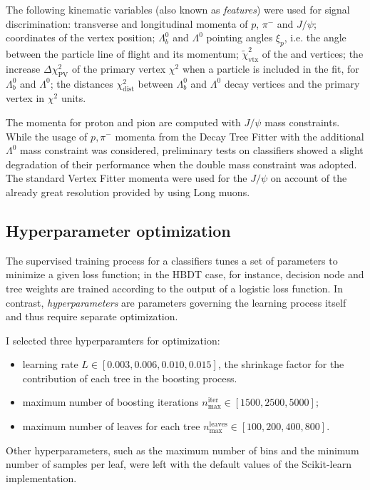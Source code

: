 The following kinematic variables (also known as \textit{features}) were used for signal discrimination:
transverse and longitudinal momenta of $p$, $\pi^-$ and $J/\psi$;
coordinates of the \lambdadecay vertex position;
$\Lambda_b^0$ and $\Lambda^0$  pointing angles $\xi_p$, i.e. the angle between the particle line of flight and its momentum;
$\tilde{\chi}^2_\text{vtx}$ of the \demonstratorshort and \lambdadecay vertices;
the increase $\Delta \chi^2_\text{PV}$ of the primary vertex $\chi^2$ when a particle is included in the fit, for $\Lambda_b^0$ and $\Lambda^0$;
the distances $\chi^2_\text{dist}$ between $\Lambda_b^0$ and $\Lambda^0$ decay vertices and the primary vertex in $\chi^2$ units.

The momenta for proton and pion are computed with $J/\psi$ mass constraints.
While the usage of $p,\pi^-$ momenta from the Decay Tree Fitter with the additional $\Lambda^0$ mass constraint was considered, preliminary tests on classifiers showed a slight degradation of their performance when the double mass constraint was adopted.
The standard Vertex Fitter momenta were used for the $J/\psi$ on account of the already great resolution provided by using Long muons.

\subsection{Hyperparameter optimization}
\label{sec:4:hyperoptimization}

The supervised training process for a classifiers tunes a set of parameters to minimize a given loss function; in the HBDT case, for instance, decision node and tree weights are trained according to the output of a logistic loss function.
In contrast, \textit{hyperparameters} are parameters governing the learning process itself and thus require separate optimization.

I selected three hyperparamters for optimization:
\begin{itemize}
	\item learning rate $L \in [0.003, 0.006, 0.010, 0.015]$, the shrinkage factor for the contribution of each tree in the boosting process.
	\item maximum number of boosting iterations $n_\text{max}^\text{iter} \in [1500, 2500, 5000]$;
	\item maximum number of leaves for each tree $n_\text{max}^\text{leaves} \in [100, 200, 400, 800]$.
\end{itemize}
Other hyperparameters, such as the maximum number of bins and the minimum number of samples per leaf, were left with the default values of the Scikit-learn implementation.

